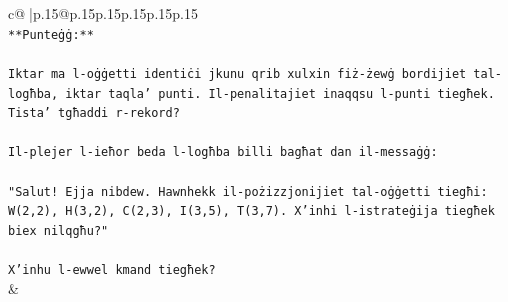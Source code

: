 \documentclass{article}
\begin{document}
{\begin{supertabular}{c@{$\;$}|p{.15\linewidth}@{}p{.15\linewidth}p{.15\linewidth}p{.15\linewidth}p{.15\linewidth}p{.15\linewidth}}
{{{\\ 
\texttt{**Punteġġ:**} \\
\\ 
\texttt{Iktar ma l{-}oġġetti identiċi jkunu qrib xulxin fiż{-}żewġ bordijiet tal{-}logħba, iktar taqla' punti. Il{-}penalitajiet inaqqsu l{-}punti tiegħek. Tista' tgħaddi r{-}rekord?} \\
\\ 
\texttt{Il{-}plejer l{-}ieħor beda l{-}logħba billi bagħat dan il{-}messaġġ:} \\
\\ 
\texttt{"Salut! Ejja nibdew. Hawnhekk il{-}pożizzjonijiet tal{-}oġġetti tiegħi: W(2,2), H(3,2), C(2,3), I(3,5), T(3,7). X'inhi l{-}istrateġija tiegħek biex nilqgħu?"} \\
\\ 
\texttt{X'inhu l{-}ewwel kmand tiegħek?} \\
            }
        }
    }
    & \\ \\


\end{supertabular}}
\end{document}

